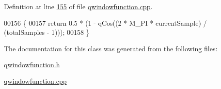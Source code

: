 Definition at line \hyperlink{a00127_source_l00155}{155} of file \hyperlink{a00127_source}{qwindowfunction.\+cpp}.


\begin{DoxyCode}
00156 \{
00157     \textcolor{keywordflow}{return} 0.5 * (1 - qCos((2 * M\_PI * currentSample) / (totalSamples - 1)));
00158 \}
\end{DoxyCode}


The documentation for this class was generated from the following files\+:\begin{DoxyCompactItemize}
\item 
\hyperlink{a00128}{qwindowfunction.\+h}\item 
\hyperlink{a00127}{qwindowfunction.\+cpp}\end{DoxyCompactItemize}
